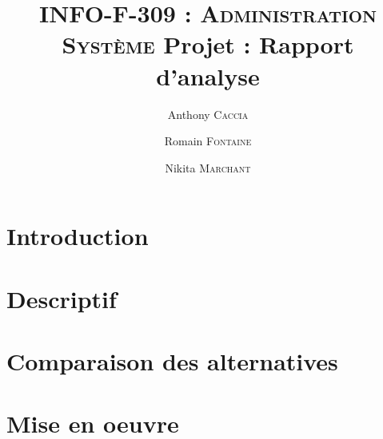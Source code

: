 \documentclass[10pt,a4paper]{article}
\author{Anthony \textsc{Caccia} \and Romain \textsc{Fontaine} \and Nikita \textsc{Marchant} }
\date{}
\title{\textsc{INFO-F-309 : Administration Système} Projet : Rapport d'analyse}
\begin{document}
\maketitle

\section{Introduction}
\section{Descriptif}
\section{Comparaison des alternatives}
\section{Mise en oeuvre}
\end{document}
